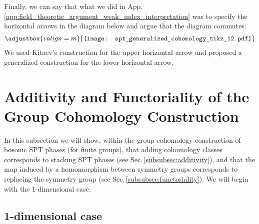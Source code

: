 \documentclass[sort&compress]{elsarticle}
\theoremstyle{theoremstyle}
\theoremstyle{framedtheoremstyle}
\theoremstyle{definitionstyle}
\theoremstyle{definitionstyle}
\theoremstyle{definitionstyle}
\theoremstyle{definitionstyle}
\theoremstyle{nameddefinitionstyle}
\theoremstyle{framednameddefinitionstyle}
\theoremstyle{proofstyle}
\theoremstyle{definitionstyle}
\newcommand{\ZZZ}{\mathbb{Z}}
\newcommand{\paren}[1]{\left( #1 \right)}
\newcommand{\SPT}{\operatorname{\mathcal{SPT}}}
\begin{document}
\begin{appendices}
Finally, we can say that what we did in App.\,\ref{app:field_theoretic_argument_weak_index_interpretation} was to specify the horizontal arrows in the diagram below and argue that the diagram commutes:
\begin{eqnarray}
\adjustbox{valign=m}{\texttt{[image: spt\_generalized\_cohomology\_tikz\_12.pdf]}}
\end{eqnarray}
We used Kitaev's construction \cite{Kitaev_IPAM} for the upper horizontal arrow and proposed a generalized construction for the lower horizontal arrow.











\section{Additivity and Functoriality of the Group Cohomology Construction\label{app:additivity_functoriality_group_cohomology_construction}}

In this subsection we will show, within the group cohomology construction \cite{Wen_Boson} of bosonic SPT phases (for finite groups), that adding cohomology classes corresponds to stacking SPT phases (see Sec.\,\ref{subsubsec:additivity}), and that the map induced by a homomorphism between symmetry groups corresponds to replacing the symmetry group (see Sec.\,\ref{subsubsec:functoriality}). We will begin with the 1-dimensional case.





\subsection{1-dimensional case\label{subapp:1_dimensional_case}}


\end{appendices}
\end{document}
